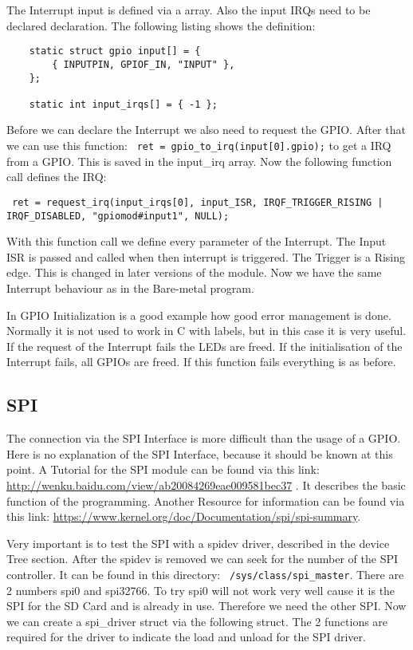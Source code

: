 The Interrupt input is defined via a array. Also the input IRQs need to be declared declaration. The following listing shows the definition: 

\begin{lstlisting}
	static struct gpio input[] = {
		{ INPUTPIN, GPIOF_IN, "INPUT" },
	};
	
	static int input_irqs[] = { -1 };
\end{lstlisting}

Before we can declare the Interrupt we also need to request the GPIO. After that we can use this function: \verb| ret = gpio_to_irq(input[0].gpio);| to get a IRQ from a GPIO. This is saved in the input\_irq array. Now the following function call defines the IRQ: 

\begin{lstlisting}
 ret = request_irq(input_irqs[0], input_ISR, IRQF_TRIGGER_RISING | IRQF_DISABLED, "gpiomod#input1", NULL);
\end{lstlisting}

With this function call we define every parameter of the Interrupt. The Input ISR is passed and called when then interrupt is triggered. The Trigger is a Rising edge. This is changed in later versions of the module. Now we have the same Interrupt behaviour as in the Bare-metal program.\newline

In GPIO Initialization is a good example how good error management is done. Normally it is not used to work in C with labels, but in this case it is very useful. If the request of the Interrupt fails the LEDs are freed. If the initialisation of the Interrupt fails, all GPIOs are freed. If this function fails everything is as before.
 
\subsection{SPI}

The connection via the SPI Interface is more difficult than the usage of a GPIO. Here is no explanation of the SPI Interface, because it should be known at this point. A Tutorial for the SPI module can be found via this link: \url{http://wenku.baidu.com/view/ab20084269eae009581bec37} . It describes the basic function of the programming. Another Resource for information can be found via this link: \url{https://www.kernel.org/doc/Documentation/spi/spi-summary}.\newline

Very important is to test the SPI with a spidev driver, described in the device Tree section. After the spidev is removed we can seek for the number of the SPI controller. It can be found in this directory: \verb| /sys/class/spi_master|. There are 2 numbers spi0 and spi32766. To try spi0 will not work very well cause it is the SPI for the SD Card and is already in use. Therefore we need the other SPI. Now we can create a spi\_driver struct via the following struct. The 2 functions are required for the driver to indicate the load and unload for the SPI driver.

